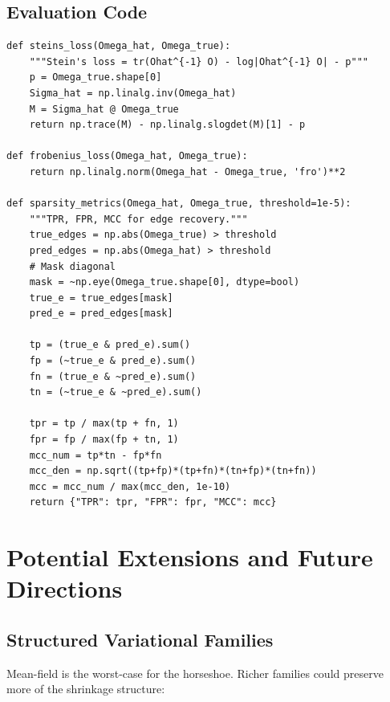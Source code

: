 \documentclass[11pt,a4paper]{article}
\begin{document}
\subsection{Evaluation Code}

\begin{lstlisting}[caption={Computing loss metrics.}]
def steins_loss(Omega_hat, Omega_true):
    """Stein's loss = tr(Ohat^{-1} O) - log|Ohat^{-1} O| - p"""
    p = Omega_true.shape[0]
    Sigma_hat = np.linalg.inv(Omega_hat)
    M = Sigma_hat @ Omega_true
    return np.trace(M) - np.linalg.slogdet(M)[1] - p

def frobenius_loss(Omega_hat, Omega_true):
    return np.linalg.norm(Omega_hat - Omega_true, 'fro')**2

def sparsity_metrics(Omega_hat, Omega_true, threshold=1e-5):
    """TPR, FPR, MCC for edge recovery."""
    true_edges = np.abs(Omega_true) > threshold
    pred_edges = np.abs(Omega_hat) > threshold
    # Mask diagonal
    mask = ~np.eye(Omega_true.shape[0], dtype=bool)
    true_e = true_edges[mask]
    pred_e = pred_edges[mask]

    tp = (true_e & pred_e).sum()
    fp = (~true_e & pred_e).sum()
    fn = (true_e & ~pred_e).sum()
    tn = (~true_e & ~pred_e).sum()

    tpr = tp / max(tp + fn, 1)
    fpr = fp / max(fp + tn, 1)
    mcc_num = tp*tn - fp*fn
    mcc_den = np.sqrt((tp+fp)*(tp+fn)*(tn+fp)*(tn+fn))
    mcc = mcc_num / max(mcc_den, 1e-10)
    return {"TPR": tpr, "FPR": fpr, "MCC": mcc}
\end{lstlisting}


\section{Potential Extensions and Future Directions}\label{sec:extensions}

\subsection{Structured Variational Families}

Mean-field is the worst-case for the horseshoe. Richer families could preserve more of the shrinkage structure:
\end{document}
